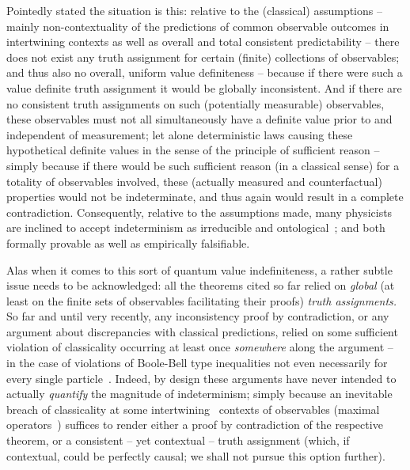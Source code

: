 \documentclass[%
 superscriptaddress,
 preprint,
 showpacs,
 showkeys,
 nofootinbib,
  amsmath,amssymb,
  aps,
  longbibliography,
  floatfix,
 ]{revtex4-1}
\theoremstyle{definition}
\begin{document}
Pointedly stated the situation is this:
relative to the (classical) assumptions -- mainly non-contextuality of the predictions of common observable outcomes in intertwining contexts as well as
overall and total consistent predictability --
there does not exist any truth assignment for certain (finite) collections of observables;
and thus also no overall, uniform value definiteness -- because if there were such a
value definite truth assignment it would be globally inconsistent.
And if there are no consistent truth assignments on such (potentially measurable) observables,
these observables must not all simultaneously have a definite value prior to and independent of measurement;
let alone deterministic laws causing these hypothetical definite values in the sense of the principle of sufficient reason --
simply because if there would be such sufficient reason (in a classical sense) for a totality of observables involved,
these (actually measured and counterfactual) properties would not be indeterminate, and thus again would result in a complete contradiction.
Consequently, relative to the assumptions made, many physicists are inclined to accept
indeterminism as irreducible and ontological~\cite{zeil-05_nature_ofQuantum};
and both formally provable as well as empirically falsifiable.

Alas when it comes to this sort of quantum value indefiniteness, a rather subtle issue needs to be acknowledged:
all the theorems cited so far relied on {\em global}
(at least on the finite sets of observables facilitating their proofs) {\em truth assignments.}
So far and until very recently, any inconsistency proof by contradiction, or any argument about discrepancies with classical predictions, relied on some sufficient violation of classicality
occurring at least once {\em somewhere} along the argument -- in the case of violations of Boole-Bell type inequalities
not even necessarily for every single particle~\cite{peres222}.
Indeed, by design these arguments have never intended to actually {\em quantify} the magnitude of indeterminism; simply because an inevitable breach of classicality at some
intertwining~\cite{Gleason} contexts of observables
(maximal operators~\cite{kochen1})
suffices to render either a proof by contradiction of the respective theorem,
or a consistent -- yet contextual -- truth assignment (which, if contextual, could be perfectly causal;
we shall not pursue this option further).
\end{document}
